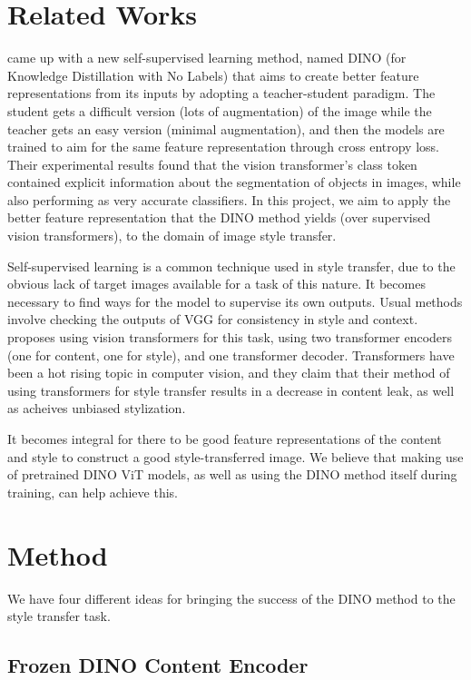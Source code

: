 \documentclass{article}
\begin{document}
\section{Related Works}

\cite{DINO} came up with a new self-supervised learning method, named DINO (for Knowledge Distillation with No Labels) that aims to create better feature representations from its inputs by adopting a teacher-student paradigm. The student gets a difficult version (lots of augmentation) of the image while the teacher gets an easy version (minimal augmentation), and then the models are trained to aim for the same feature representation through cross entropy loss. Their experimental results found that the vision transformer's class token contained explicit information about the segmentation of objects in images, while also performing as very accurate classifiers. In this project, we aim to apply the better feature representation that the DINO method yields (over supervised vision transformers), to the domain of image style transfer.

Self-supervised learning is a common technique used in style transfer, due to the obvious lack of target images available for a task of this nature. It becomes necessary to find ways for the model to supervise its own outputs. Usual methods \cite{CNNStyleTransfer} involve checking the outputs of VGG for consistency in style and context. \cite{ImageStyleTransformer} proposes using vision transformers for this task, using two transformer encoders (one for content, one for style), and one transformer decoder. Transformers have been a hot rising topic in computer vision, and they claim that their method of using transformers for style transfer results in a decrease in content leak, as well as acheives unbiased stylization.

It becomes integral for there to be good feature representations of the content and style to construct a good style-transferred image. We believe that making use of pretrained DINO ViT models, as well as using the DINO method itself during training, can help achieve this.


\section{Method}

We have four different ideas for bringing the success of the DINO method to the style transfer task.

\subsection{Frozen DINO Content Encoder}
\end{document}
